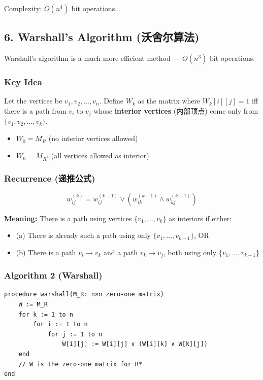\documentclass[10pt,a4paper,openany]{ctexbook}
\theoremstyle{definition}
\theoremstyle{remark}
\begin{document}
Complexity: $O(n^4)$ bit operations.
\vspace{-2pt}

\subsection{6. Warshall's Algorithm (沃舍尔算法)}

Warshall's algorithm is a much more efficient method — $O(n^3)$ bit operations.
\subsubsection{Key Idea}

Let the vertices be $v_1, v_2, \dots, v_n$. Define $W_k$ as the matrix where $W_k[i][j] = 1$ iff there is a path from $v_i$ to $v_j$ whose \textbf{interior vertices} (内部顶点) come only from $\{v_1, v_2, \dots, v_k\}$.
\begin{itemize}
\item $W_0 = M_R$ (no interior vertices allowed)
\item $W_n = M_{R^*}$ (all vertices allowed as interior)

\end{itemize}

\subsubsection{Recurrence (递推公式)}

\[
w_{ij}^{(k)} = w_{ij}^{(k-1)} \lor \left(w_{ik}^{(k-1)} \land w_{kj}^{(k-1)}\right)
\]

\textbf{Meaning:} There is a path using vertices $\{v_1, \dots, v_k\}$ as interiors if either:
\begin{itemize}
\item (a) There is already such a path using only $\{v_1, \dots, v_{k-1}\}$, OR
\item (b) There is a path $v_i \to v_k$ and a path $v_k \to v_j$, both using only $\{v_1, \dots, v_{k-1}\}$

\end{itemize}

\subsubsection{Algorithm 2 (Warshall)}

{\footnotesize\begin{verbatim}
procedure warshall(M_R: n×n zero-one matrix)
    W := M_R
    for k := 1 to n
        for i := 1 to n
            for j := 1 to n
                W[i][j] := W[i][j] ∨ (W[i][k] ∧ W[k][j])
    end
    // W is the zero-one matrix for R*
end
\end{verbatim}}
\end{document}
